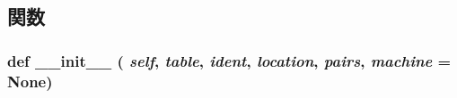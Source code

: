\subsection{関数}
\hypertarget{classslicc_1_1symbols_1_1Type_1_1Type_ac775ee34451fdfa742b318538164070e}{
\subsubsection[{\_\-\_\-init\_\-\_\-}]{\setlength{\rightskip}{0pt plus 5cm}def \_\-\_\-init\_\-\_\- ( {\em self}, \/   {\em table}, \/   {\em ident}, \/   {\em location}, \/   {\em pairs}, \/   {\em machine} = {\ttfamily None})}}
\label{classslicc_1_1symbols_1_1Type_1_1Type_ac775ee34451fdfa742b318538164070e}



